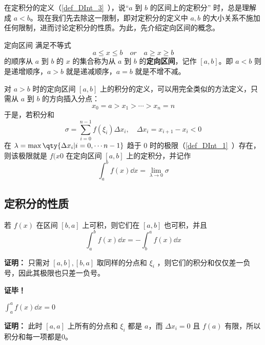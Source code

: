 
在定积分的定义（\autoref{def_DInt_3}~），说“$a$ 到 $b$ 的区间上的定积分” 时，总是理解成 $a<b$。现在我们先去除这一限制，即对定积分的定义中 $a,b$ 的大小关系不施加任何限制，进而讨论定积分的性质。为此，先介绍定向区间的概念。

\begin{definition}{定向区间}
满足不等式
\begin{equation}
a\leq x\leq b\quad or\quad a\geq x\geq b
\end{equation}
的顺序从 $a$ 到 $b$ 的 $x$ 的集合称为从 $a$ 到 $b$ 的\textbf{定向区间}，记作 $[a,b]$。即 $a<b$ 则是递增顺序，$a>b$ 就是递减顺序，$a=b$ 就是不增不减。
\end{definition}
对 $a>b$ 时的定向区间 $[a,b]$ 上的积分的定义，可以用完全类似的方法定义，只需从 $a$ 到 $b$ 的方向插入分点：
\begin{equation}
x_0=a>x_1>\cdots>x_n=n
\end{equation}
于是，若积分和
\begin{equation}
\sigma=\sum_{i=0}^{n-1}f(\xi_i)\Delta x_i,\quad\Delta x_i=x_{i+1}-x_i<0
\end{equation}
在 $\lambda=\max\qty{\Delta x_i|i=0,\cdots n-1}$ 趋于 0 时的极限（\autoref{def_DInt_1}~）存在，则该极限就是 $f(x0$ 在定向区间 $[a,b]$ 上的定积分，并记作
\begin{equation}
\int_a^b f(x)\dd x=\lim_{\lambda\rightarrow0}\sigma
\end{equation}

\subsection{定积分的性质}
\begin{theorem}{}\label{the_DIntP_2}
若 $f(x)$ 在区间 $[b,a]$ 上可积，则它们在 $[a,b]$ 也可积，并且
\begin{equation}
\int_a^b f(x)\dd x=-\int_b^a f(x)\dd x
\end{equation}
\end{theorem} 

\textbf{证明：}
只需对 $[a,b],[b,a]$ 取同样的分点和 $\xi_i$ ，则它们的积分和仅仅差一负号，因此其极限也只差一负号。

\textbf{证毕！}
\begin{theorem}{}\label{the_DIntP_1}
$\int_a^a f(x)\dd x=0$
\end{theorem}
\textbf{证明：}
此时 $[a,a]$ 上所有的分点和 $\xi_i$ 都是 $a$，而 $\Delta x_i=0$ 且 $f(a)$ 有限，所以积分和每一项都是0。

